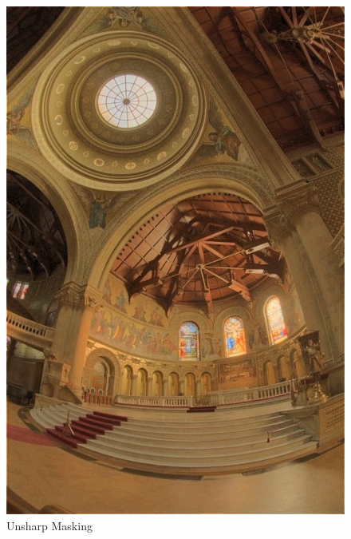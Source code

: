 \documentclass{article}
\begin{document}
\begin{figure}[!htb]
      \includegraphics[scale=.27]{./data/2/ln/s3.jpg}
      \caption{Unsharp Masking}
    \endminipage
    \end{figure}
\end{document}
